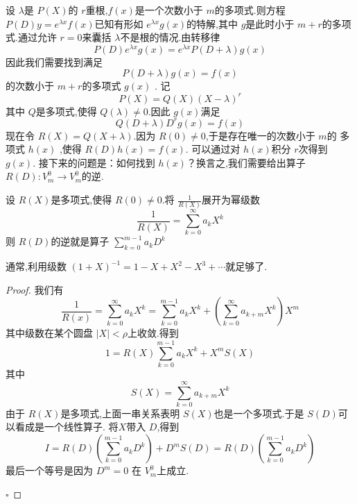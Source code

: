 \documentclass[lang=cn,12pt,color=green,fontset=none]{elegantbook}
\begin{document}
设 \(  \lambda  \)是 \(  P\left( X \right)   \)的 \(  r  \)重根,\(  f\left( x \right)   \)是一个次数小于 \(  m  \)的多项式.则方程 \(  P\left( D \right)y = e^{\lambda x}f\left( x \right)    \)已知有形如 \(  e^{\lambda x}g\left( x \right)   \)的特解,其中 \(  g  \)是此时小于
 \(  m+ r  \)的多项式.通过允许 \(  r=0  \)来囊括 \(  \lambda  \)不是根的情况.由转移律 \[
 P\left( D \right)e^{\lambda x}g\left( x \right) =  e^{\lambda x} P\left( D+ \lambda \right)g\left( x \right)    
 \]   因此我们需要找到满足 \[
 P\left( D+ \lambda \right)g\left( x \right)= f\left( x \right)   
 \]的次数小于 \(  m+ r  \)的多项式 \(  g\left( x \right)   \) .   记 \[
 P\left( X \right) = Q\left( X \right)\left( X-\lambda \right)^{r}   
 \]其中 \(  Q  \)是多项式,使得 \(  Q\left( \lambda \right)\neq 0   \).因此 \(  g\left( x \right)   \)满足 \[
  Q\left( D+ \lambda \right)D^{r} g\left( x \right) =f\left( x \right)   
 \]   现在令 \(  R\left( X \right) =Q\left( X+ \lambda \right)    \).因为 \(  R\left( 0 \right)\neq 0   \),于是存在唯一的次数小于 \(  m  \)的 多项式 \(  h\left( x \right)   \)   ,使得 \(  R\left( D \right)h\left( x \right)=f\left( x \right)     \).
 可以通过对 \(  h\left( x \right)   \)积分 \(  r  \)次得到 \(  g\left( x \right)   \).
 接下来的问题是：如何找到 \(  h\left( x \right)   \)？换言之,我们需要给出算子 \(  R\left( D \right):V_{m}^{0}\to V_{m}^{0}   \)的逆.      

\begin{proposition}
    设 \(  R\left( X \right)   \)是多项式,使得 \(  R\left( 0 \right)\neq 0   \).将 \(  \frac{1}{R\left( X \right) }  \)展开为幂级数 \[
        \frac{1}{R\left( X \right) } = \sum _{k=0}^{\infty}a_{k}X^{k}
        \]   则 \(  R\left( D \right)   \)的逆就是算子 \(  \sum _{k=0}^{m-1}a_{k}D^{k}  \)  
\end{proposition}
\begin{remark}
    通常,利用级数 \(  \left( 1+ X \right)   ^{-1} = 1-X+ X^{2}-X^{3}+ \cdots \)就足够了. 
\end{remark}
\begin{proof}
    我们有 \[
    \frac{1}{R\left( x \right)  } = \sum _{k=0}^{\infty}a_{k}X^{k}= \sum _{k=0}^{m-1}a_{k}X^{k}+ \left( \sum _{k=0}^{\infty}a_{k+ m}X^{k} \right)X^{m} 
    \]其中级数在某个圆盘 \(  \left| X \right|<\rho   \)上收敛.得到 \[
    1= R\left( X \right)\sum _{k=0}^{m-1}a_{k}X^{k}+ X^{m}S\left( X \right)  
    \] 其中 \[
    S\left( X \right) = \sum _{k=0}^{\infty}a_{k+ m}X^{k} 
    \]由于 \(  R\left( X \right)   \)是多项式,上面一串关系表明 \(  S\left( X \right)   \)也是一个多项式.于是 \(  S\left( D \right)   \)可以看成是一个线性算子.
    将\(  X  \)带入 \(  D  \),得到 \[
    I = R\left( D \right)\left( \sum _{k=0}^{m-1}a_{k}D^{k} \right)+ D^{m}S\left( D \right) =R\left( D \right)    \left( \sum _{k=0}^{m-1}a_{k}D^{k} \right) 
    \]    最后一个等号是因为 \(  D^{m}=0  \)  在 \(  V_{m}^{0}  \)上成立. 

    \hfill $\square$
\end{proof}
\end{document}
